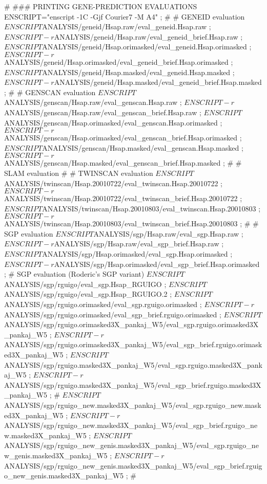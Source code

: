 \documentclass[11pt]{article}
\def\nwendcode{\endtrivlist \endgroup} %
\let\nwdocspar=\par                    %
\begin{document}
\nwenddocs{}\plusendmoddef
#
### PRINTING GENE-PREDICTION EVALUATIONS
ENSCRIPT="enscript -1C -Gjf Courier7 -M A4" ;
#
# GENEID evaluation
$ENSCRIPT $ANALYSIS/geneid/Hsap.raw/eval_geneid.Hsap.raw ;
$ENSCRIPT -r $ANALYSIS/geneid/Hsap.raw/eval_geneid_brief.Hsap.raw ;
$ENSCRIPT $ANALYSIS/geneid/Hsap.orimasked/eval_geneid.Hsap.orimasked ;
$ENSCRIPT -r $ANALYSIS/geneid/Hsap.orimasked/eval_geneid_brief.Hsap.orimasked ;
$ENSCRIPT $ANALYSIS/geneid/Hsap.masked/eval_geneid.Hsap.masked ;
$ENSCRIPT -r $ANALYSIS/geneid/Hsap.masked/eval_geneid_brief.Hsap.masked ;
#
# GENSCAN evaluation
$ENSCRIPT $ANALYSIS/genscan/Hsap.raw/eval_genscan.Hsap.raw ;
$ENSCRIPT -r $ANALYSIS/genscan/Hsap.raw/eval_genscan_brief.Hsap.raw ;
$ENSCRIPT $ANALYSIS/genscan/Hsap.orimasked/eval_genscan.Hsap.orimasked ;
$ENSCRIPT -r $ANALYSIS/genscan/Hsap.orimasked/eval_genscan_brief.Hsap.orimasked ;
$ENSCRIPT $ANALYSIS/genscan/Hsap.masked/eval_genscan.Hsap.masked ;
$ENSCRIPT -r $ANALYSIS/genscan/Hsap.masked/eval_genscan_brief.Hsap.masked ;
#
# SLAM evaluation
#
# TWINSCAN evaluation
$ENSCRIPT $ANALYSIS/twinscan/Hsap.20010722/eval_twinscan.Hsap.20010722 ;
$ENSCRIPT -r $ANALYSIS/twinscan/Hsap.20010722/eval_twinscan_brief.Hsap.20010722 ;
$ENSCRIPT $ANALYSIS/twinscan/Hsap.20010803/eval_twinscan.Hsap.20010803 ;
$ENSCRIPT -r $ANALYSIS/twinscan/Hsap.20010803/eval_twinscan_brief.Hsap.20010803 ;
#
# SGP evaluation
$ENSCRIPT $ANALYSIS/sgp/Hsap.raw/eval_sgp.Hsap.raw ;
$ENSCRIPT -r $ANALYSIS/sgp/Hsap.raw/eval_sgp_brief.Hsap.raw ;
$ENSCRIPT $ANALYSIS/sgp/Hsap.orimasked/eval_sgp.Hsap.orimasked ;
$ENSCRIPT -r $ANALYSIS/sgp/Hsap.orimasked/eval_sgp_brief.Hsap.orimasked ;
# SGP evaluation (Roderic's SGP variant)
$ENSCRIPT $ANALYSIS/sgp/rguigo/eval_sgp.Hsap_RGUIGO ;
$ENSCRIPT $ANALYSIS/sgp/rguigo/eval_sgp.Hsap_RGUIGO.2 ;
$ENSCRIPT $ANALYSIS/sgp/rguigo.orimasked/eval_sgp.rguigo.orimasked ;
$ENSCRIPT -r $ANALYSIS/sgp/rguigo.orimasked/eval_sgp_brief.rguigo.orimasked ;
$ENSCRIPT $ANALYSIS/sgp/rguigo.orimasked3X_pankaj_W5/eval_sgp.rguigo.orimasked3X_pankaj_W5 ;
$ENSCRIPT -r $ANALYSIS/sgp/rguigo.orimasked3X_pankaj_W5/eval_sgp_brief.rguigo.orimasked3X_pankaj_W5 ;
$ENSCRIPT $ANALYSIS/sgp/rguigo.masked3X_pankaj_W5/eval_sgp.rguigo.masked3X_pankaj_W5 ;
$ENSCRIPT -r $ANALYSIS/sgp/rguigo.masked3X_pankaj_W5/eval_sgp_brief.rguigo.masked3X_pankaj_W5 ;
#
$ENSCRIPT $ANALYSIS/sgp/rguigo_new.masked3X_pankaj_W5/eval_sgp.rguigo_new.masked3X_pankaj_W5 ;
$ENSCRIPT -r $ANALYSIS/sgp/rguigo_new.masked3X_pankaj_W5/eval_sgp_brief.rguigo_new.masked3X_pankaj_W5 ;
$ENSCRIPT $ANALYSIS/sgp/rguigo_new_genis.masked3X_pankaj_W5/eval_sgp.rguigo_new_genis.masked3X_pankaj_W5 ;
$ENSCRIPT -r $ANALYSIS/sgp/rguigo_new_genis.masked3X_pankaj_W5/eval_sgp_brief.rguigo_new_genis.masked3X_pankaj_W5 ;
#
\nwendcode{}\nwdocspar
\end{document}
